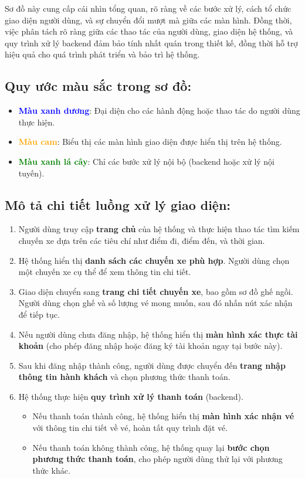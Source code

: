 Sơ đồ này cung cấp cái nhìn tổng quan, rõ ràng về các bước xử lý, cách tổ chức giao diện người dùng, và sự chuyển đổi mượt mà giữa các màn hình. Đồng thời, việc phân tách rõ ràng giữa các thao tác của người dùng, giao diện hệ thống, và quy trình xử lý backend đảm bảo tính nhất quán trong thiết kế, đồng thời hỗ trợ hiệu quả cho quá trình phát triển và bảo trì hệ thống.

\subsection*{Quy ước màu sắc trong sơ đồ:}
\begin{itemize}
    \item \textcolor{blue}{\textbf{Màu xanh dương}}: Đại diện cho các hành động hoặc thao tác do người dùng thực hiện.
    \item \textcolor{orange}{\textbf{Màu cam}}: Biểu thị các màn hình giao diện được hiển thị trên hệ thống.
    \item \textcolor{green}{\textbf{Màu xanh lá cây}}: Chỉ các bước xử lý nội bộ (backend hoặc xử lý nội tuyến).
\end{itemize}

\subsection*{Mô tả chi tiết luồng xử lý giao diện:}
\begin{enumerate}
    \item Người dùng truy cập \textbf{trang chủ} của hệ thống và thực hiện thao tác tìm kiếm chuyến xe dựa trên các tiêu chí như điểm đi, điểm đến, và thời gian.
    \item Hệ thống hiển thị \textbf{danh sách các chuyến xe phù hợp}. Người dùng chọn một chuyến xe cụ thể để xem thông tin chi tiết.
    \item Giao diện chuyển sang \textbf{trang chi tiết chuyến xe}, bao gồm sơ đồ ghế ngồi. Người dùng chọn ghế và số lượng vé mong muốn, sau đó nhấn nút xác nhận để tiếp tục.
    \item Nếu người dùng chưa đăng nhập, hệ thống hiển thị \textbf{màn hình xác thực tài khoản} (cho phép đăng nhập hoặc đăng ký tài khoản ngay tại bước này).
    \item Sau khi đăng nhập thành công, người dùng được chuyển đến \textbf{trang nhập thông tin hành khách} và chọn phương thức thanh toán.
    \item Hệ thống thực hiện \textbf{quy trình xử lý thanh toán} (backend). 
    \begin{itemize}
        \item Nếu thanh toán thành công, hệ thống hiển thị \textbf{màn hình xác nhận vé} với thông tin chi tiết về vé, hoàn tất quy trình đặt vé.
        \item Nếu thanh toán không thành công, hệ thống quay lại \textbf{bước chọn phương thức thanh toán}, cho phép người dùng thử lại với phương thức khác.
    \end{itemize}
\end{enumerate}

